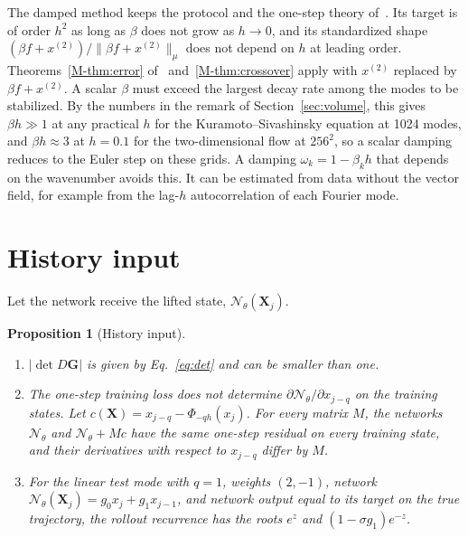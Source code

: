 \documentclass[11pt]{article}
\newcommand{\Mref}[1]{\ref{M-#1} of~\cite{main}}
\newtheorem{proposition}{Proposition}
\theoremstyle{definition}
\theoremstyle{remark}
\newcommand{\Net}{\mathcal{N}_\theta}
\newcommand{\bX}{\mathbf{X}}
\newcommand{\bG}{\mathbf{G}}
\begin{document}
The damped method keeps the protocol and the one-step theory of~\cite{main}.
Its target is of order $h^2$ as long as $\beta$ does not grow as $h \to 0$, and its standardized shape $(\beta f + x^{(2)})/\|\beta f + x^{(2)}\|_\mu$ does not depend on $h$ at leading order.
Theorems~\Mref{thm:error} and~\ref{M-thm:crossover} apply with $x^{(2)}$ replaced by $\beta f + x^{(2)}$.
A scalar $\beta$ must exceed the largest decay rate among the modes to be stabilized.
By the numbers in the remark of Section~\ref{sec:volume}, this gives $\beta h \gg 1$ at any practical $h$ for the Kuramoto--Sivashinsky equation at 1024 modes, and $\beta h \approx 3$ at $h = 0.1$ for the two-dimensional flow at $256^2$, so a scalar damping reduces to the Euler step on these grids.
A damping $\omega_k = 1 - \beta_kh$ that depends on the wavenumber avoids this.
It can be estimated from data without the vector field, for example from the lag-$h$ autocorrelation of each Fourier mode.

\section{History input}\label{sec:history}

Let the network receive the lifted state, $\Net(\bX_j)$.

\begin{proposition}[History input]\label{prop:history}
\begin{enumerate}[label=(\alph*)]
\item $|\det D\bG|$ is given by Eq.~\eqref{eq:det} and can be smaller than one.
\item The one-step training loss does not determine $\partial\Net/\partial x_{j-q}$ on the training states. Let $c(\bX) = x_{j-q} - \Phi_{-qh}(x_j)$. For every matrix $M$, the networks $\Net$ and $\Net + Mc$ have the same one-step residual on every training state, and their derivatives with respect to $x_{j-q}$ differ by $M$.
\item For the linear test mode with $q = 1$, weights $(2,-1)$, network $\Net(\bX_j) = g_0x_j + g_1x_{j-1}$, and network output equal to its target on the true trajectory, the rollout recurrence has the roots $e^z$ and $(1 - \sigma g_1)e^{-z}$.
\end{enumerate}
\end{proposition}
\end{document}
